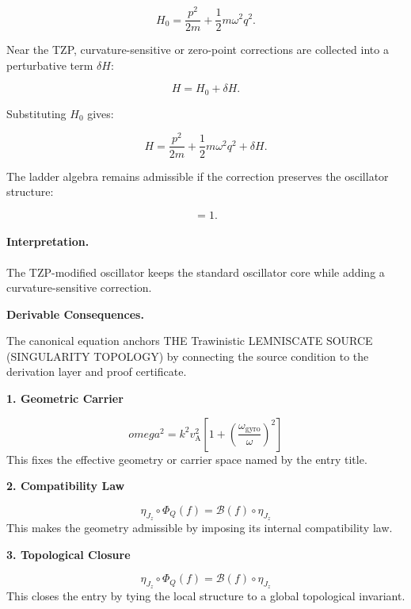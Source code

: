 \begin{equation}
H_0
=
\frac{p^2}{2m}
+
\frac{1}{2}m\omega^2 q^2 .
\end{equation}

Near the TZP, curvature-sensitive or zero-point corrections are collected into a perturbative term $\delta H$:

\begin{equation}
H = H_0+\delta H .
\end{equation}

Substituting $H_0$ gives:

\begin{equation}
\boxed{
H
=
\frac{p^2}{2m}
+
\frac{1}{2}m\omega^2 q^2
+
\delta H .
}
\end{equation}

The ladder algebra remains admissible if the correction preserves the oscillator structure:

\begin{equation}
[a,a^\dagger]=1 .
\end{equation}

\paragraph{Interpretation.}
The TZP-modified oscillator keeps the standard oscillator core while adding a curvature-sensitive correction.

\par\vspace{0.35em}
\noindent\textbf{Derivable Consequences.}\quad
\begingroup
\footnotesize
\raggedright
The canonical equation anchors THE Trawinistic LEMNISCATE SOURCE (SINGULARITY TOPOLOGY) by connecting the source condition to the derivation layer and proof certificate.
\par\endgroup

\noindent\textbf{1. Geometric Carrier}\par
\[
omega^{2} = k^{2} v_{\mathrm{A}}^{2}\left[1 + \left(\frac{\omega_{\mathrm{gyro}}}{\omega}\right)^{2}\right]
\]
\noindent This fixes the effective geometry or carrier space named by the entry title.\par
\noindent\textbf{2. Compatibility Law}\par
\[
\eta_{J_z}\circ\Phi_Q(f)=\mathcal{B}(f)\circ\eta_{J_z}
\]
\noindent This makes the geometry admissible by imposing its internal compatibility law.\par
\noindent\textbf{3. Topological Closure}\par
\[
\eta_{J_z}\circ\Phi_Q(f)=\mathcal{B}(f)\circ\eta_{J_z}
\]
\noindent This closes the entry by tying the local structure to a global topological invariant.\par

